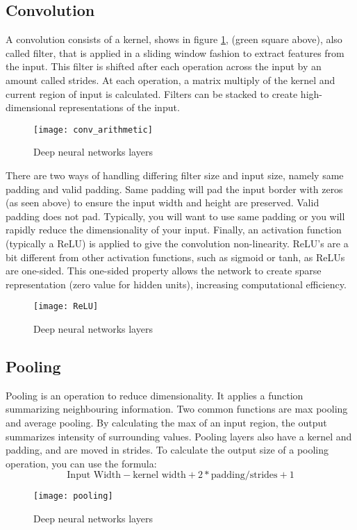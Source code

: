 \subsection{Convolution}
\label{ssec:convolution}
%
A convolution consists of a kernel, shows in figure \ref{fig:convolution}, 
(green square above), also called filter,
that is applied in a sliding window fashion to extract features from the input.
This filter is shifted after each operation across the input by an amount called
strides. At each operation, a matrix multiply of the kernel and current region
of input is calculated. Filters can be stacked to create high-dimensional
representations of the input.
%
\begin{figure}[!h]
\centering
\texttt{[image: conv\_arithmetic]}
\caption{Deep neural networks layers}
\label{fig:convolution}
\end{figure}
%
There are two ways of handling differing filter size and input size, namely
same padding and valid padding.
Same padding will pad the input border with zeros (as seen above) to ensure the
input width and height are preserved. Valid padding does not pad.
Typically, you will want to use same padding or you will rapidly reduce the
dimensionality of your input.
Finally, an activation function (typically a ReLU) is applied to give the
convolution non-linearity.
ReLU’s are a bit different from other activation functions, such as sigmoid or
tanh, as ReLUs are one-sided.
This one-sided property allows the network to create sparse representation
(zero value for hidden units), increasing computational efficiency.
%
\begin{figure}[htb]
\centering
\texttt{[image: ReLU]}
\caption{Deep neural networks layers}
\label{fig:relu}
\end{figure}
%
\subsection{Pooling}
\label{ssec:pooling}
Pooling is an operation to reduce dimensionality. 
It applies a function summarizing neighbouring information.
Two common functions are max pooling and average pooling.
By calculating the max of an input region, the output summarizes intensity of
surrounding values.
Pooling layers also have a kernel and padding, and are moved in strides.
To calculate the output size of a pooling operation, you can use the formula:
\begin{equation}
 \text{Input Width} - \text{kernel width} + 2 * \text{padding}  / \text{strides} + 1
\end{equation}
%
\begin{figure}[htb]
\centering
\texttt{[image: pooling]}
\caption{Deep neural networks layers}
\label{fig:pooling}
\end{figure}
%
